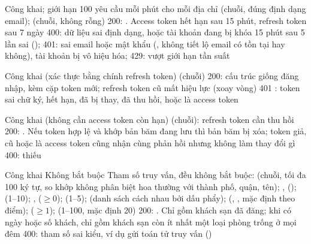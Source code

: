 {}
{Công khai; giới hạn 100 yêu cầu mỗi phút cho mỗi địa chỉ}
{}
{ (chuỗi, đúng định dạng email);  (chuỗi, không rỗng)}
{200: . Access token hết hạn sau 15 phút, refresh token sau 7 ngày}
{400: dữ liệu sai định dạng, hoặc tài khoản đang bị khóa 15 phút sau 5 lần sai (); 401: sai email hoặc mật khẩu (, không tiết lộ email có tồn tại hay không), tài khoản bị vô hiệu hóa; 429: vượt giới hạn tần suất}

{}
{Công khai (xác thực bằng chính refresh token)}
{}
{ (chuỗi)}
{200: cấu trúc giống đăng nhập, kèm cặp token mới; refresh token cũ mất hiệu lực (xoay vòng)}
{401 : token sai chữ ký, hết hạn, đã bị thay, đã thu hồi, hoặc là access token}

{}
{Công khai (không cần access token còn hạn)}
{}
{ (chuỗi): refresh token cần thu hồi}
{200: . Nếu token hợp lệ và khớp bản băm đang lưu thì bản băm bị xóa; token giả, cũ hoặc là access token cũng nhận cùng phản hồi nhưng không làm thay đổi gì}
{400: thiếu }

{}
{Công khai}
{Không bắt buộc}
{Tham số truy vấn, đều không bắt buộc:  (chuỗi, tối đa 100 ký tự, so khớp không phân biệt hoa thường với thành phố, quận, tên); ,  ();  (1--10); ,  ($\ge 0$);  (1--5);  (danh sách cách nhau bởi dấu phẩy);  (, , mặc định theo điểm);  ($\ge 1$);  (1--100, mặc định 20)}
{200: . Chỉ gồm khách sạn đã đăng; khi có ngày hoặc số khách, chỉ gồm khách sạn còn ít nhất một loại phòng trống ở mọi đêm}
{400: tham số sai kiểu, ví dụ gửi toán tử truy vấn ()}

